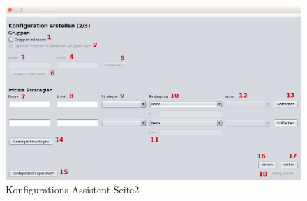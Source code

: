 \begin{figure}[hp] 
  \centering
     \includegraphics[width=1.1\textwidth]{GUI_Entwurf/WizardFenster2.png}
  \caption{Konfigurations-Assistent-Seite2}
  \label{fig:Bild3}
\end{figure}

